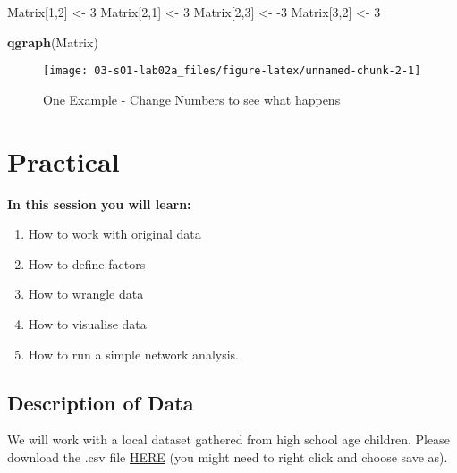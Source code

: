 \documentclass[]{book}
\newenvironment{Shaded}{\begin{snugshade}}{\end{snugshade}}
\newcommand{\DecValTok}[1]{\textcolor[rgb]{0.00,0.00,0.81}{#1}}
\newcommand{\KeywordTok}[1]{\textcolor[rgb]{0.13,0.29,0.53}{\textbf{#1}}}
\newcommand{\NormalTok}[1]{#1}
\newcommand{\StringTok}[1]{\textcolor[rgb]{0.31,0.60,0.02}{#1}}
\providecommand{\tightlist}{%
  \setlength{\itemsep}{0pt}\setlength{\parskip}{0pt}}
\begin{document}
\begin{Shaded}
\begin{Highlighting}[]
\NormalTok{Matrix[}\DecValTok{1}\NormalTok{,}\DecValTok{2}\NormalTok{] <-}\StringTok{ }\DecValTok{3}
\NormalTok{Matrix[}\DecValTok{2}\NormalTok{,}\DecValTok{1}\NormalTok{] <-}\StringTok{ }\DecValTok{3}
\NormalTok{Matrix[}\DecValTok{2}\NormalTok{,}\DecValTok{3}\NormalTok{] <-}\StringTok{ }\DecValTok{-3}
\NormalTok{Matrix[}\DecValTok{3}\NormalTok{,}\DecValTok{2}\NormalTok{] <-}\StringTok{ }\DecValTok{3}

\KeywordTok{qgraph}\NormalTok{(Matrix)}
\end{Highlighting}
\end{Shaded}

\begin{figure}

{\centering \texttt{[image: 03-s01-lab02a\_files/figure-latex/unnamed-chunk-2-1]} 

}

\caption{One Example - Change Numbers to see what happens}\label{fig:unnamed-chunk-2}
\end{figure}

\hypertarget{practical}{%
\chapter{Practical}\label{practical}}

\textbf{In this session you will learn:}

\begin{enumerate}
\def\labelenumi{\arabic{enumi}.}
\tightlist
\item
  How to work with original data
\item
  How to define factors
\item
  How to wrangle data
\item
  How to visualise data
\item
  How to run a simple network analysis.
\end{enumerate}

\hypertarget{description-of-data}{%
\section{Description of Data}\label{description-of-data}}

We will work with a local dataset gathered from high school age children. Please download the .csv file \href{data/networkdataset.csv}{HERE} (you might need to right click and choose save as).
\end{document}
